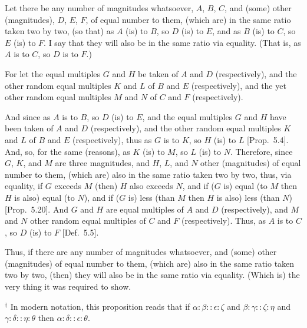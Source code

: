 \begin{Parallel}{}{}
{Let there be any number of magnitudes whatsoever, $A$, $B$,  $C$, and
(some) other (magnitudes), $D$, $E$, $F$, of equal number to them, (which are)
in the same ratio taken two by two, (so that) as $A$ (is) to $B$, so
$D$ (is) to $E$, and as $B$ (is) to $C$, so $E$ (is) to $F$. I say that they
will also be in the same ratio via equality. (That is, as $A$ is to $C$, so
$D$ is to $F$.)

For let the equal multiples $G$ and $H$ be taken of $A$ and $D$ (respectively), and the other random equal multiples $K$ and $L$ of $B$ and
$E$ (respectively), and the yet other random equal multiples $M$ and $N$ of
$C$ and $F$ (respectively).

And since as $A$ is to $B$, so $D$ (is) to $E$, and the equal multiples $G$ and $H$
have been taken of $A$ and $D$ (respectively), and the other random
equal multiples $K$ and $L$ of $B$ and $E$ (respectively), thus as $G$ is to $K$,
so $H$ (is) to $L$ [Prop.~5.4]. And, so, for the same
(reasons), as $K$ (is) to $M$, so $L$ (is) to $N$. Therefore, since $G$, $K$, and $M$ are three magnitudes, and $H$, $L$, and $N$ other (magnitudes) of equal number to them,
(which are) also in the same ratio taken two by two, thus, via equality,
if $G$ exceeds $M$ (then) $H$ also exceeds $N$, and if ($G$ is) equal (to $M$ then $H$
is also) equal (to $N$), and if ($G$ is) less (than $M$ then $H$
is also) less (than $N$) [Prop.~5.20].
And  $G$ and $H$ are equal multiples of $A$ and $D$ (respectively),
and $M$ and $N$ other random equal multiples of $C$ and $F$ (respectively).
Thus, as $A$ is to $C$, so $D$ (is) to $F$ [Def.~5.5].

Thus, if there are any number of magnitudes
whatsoever, and (some) other (magnitudes) of equal number to them, (which are)
also in the same ratio taken two by two, (then) they will also be in the
same ratio via equality. (Which is) the very thing
it was required to show.}
\end{Parallel}
{\footnotesize \noindent $^\dag$ In modern notation, this proposition
reads that if $\alpha:\beta::\epsilon:\zeta$ and $\beta:\gamma::\zeta:\eta$ 
and $\gamma:\delta::\eta:\theta$ 
then $\alpha:\delta::\epsilon:\theta$.}

